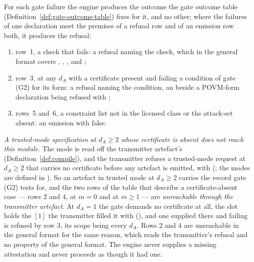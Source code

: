 \begin{requirement}\label{req:gate-outcomes}
For each gate failure the engine produces the outcome the gate outcome table
(Definition~\ref{def:gate-outcome-table}) fixes for it, and no other; where
the failures of one declaration meet the premises of a refusal row and of an
emission row both, it produces the refusal:
\begin{enumerate}[label=(\roman*),leftmargin=2.2em]
\item row~1, a check that fails: a refusal naming the check, which in the
  general format covers ,
  , ,
   and
  ;
\item row~3,  at any $d_A$ with a certificate present and
  failing a condition of gate (G2) for its form: a refusal naming the
  condition, an  beside a POVM-form declaration being refused with
  ;
\item rows~5 and~6, a constraint list not in the licensed class or the
  attack-set   absent: an emission
  with  false.
\end{enumerate}
\emph{A trusted-mode specification at $d_A\ge2$ whose certificate is absent
does not reach this module.} The mode is read off the transmitter artefact's
 (Definition~\ref{def:compile}), and the transmitter
refuses a trusted-mode request at $d_A\ge2$ that carries no certificate before
any artefact is emitted, with 
(; the modes are defined in
). So an artefact in trusted mode at
$d_A\ge2$ carries the record gate (G2) tests for, and the two rows of the
table that describe a certificate-absent case --- rows 2 and 4, at $m=0$ and
at $m\ge1$ --- are \emph{unreachable through the transmitter artefact}. At
$d_A=1$ the gate demands no certificate at all, the slot holds the $[1]$ the
transmitter filled it with (), and one
supplied there and failing is refused by row 3, its scope being every $d_A$.
Rows 2 and 4 are unreachable in the general format for the same reason, which
reads the transmitter's refusal and no property of the general format. The
engine never supplies a missing attestation and never proceeds as though it
had one.
\end{requirement}
